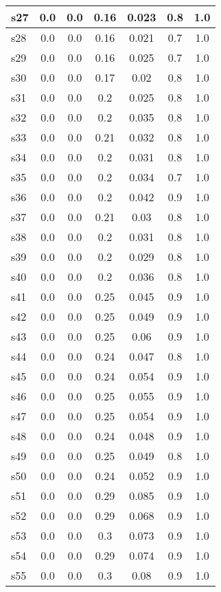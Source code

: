 \documentclass{article}
\begin{document}
\begin{tabular}{|l|c|c|c|c|c|c|}
\hline
s27 &0.0 & 0.0 & 0.16 & 0.023 & 0.8 & 1.0\\
\hline
s28 &0.0 & 0.0 & 0.16 & 0.021 & 0.7 & 1.0\\
\hline
s29 &0.0 & 0.0 & 0.16 & 0.025 & 0.7 & 1.0\\
\hline
s30 &0.0 & 0.0 & 0.17 & 0.02 & 0.8 & 1.0\\
\hline
s31 &0.0 & 0.0 & 0.2 & 0.025 & 0.8 & 1.0\\
\hline
s32 &0.0 & 0.0 & 0.2 & 0.035 & 0.8 & 1.0\\
\hline
s33 &0.0 & 0.0 & 0.21 & 0.032 & 0.8 & 1.0\\
\hline
s34 &0.0 & 0.0 & 0.2 & 0.031 & 0.8 & 1.0\\
\hline
s35 &0.0 & 0.0 & 0.2 & 0.034 & 0.7 & 1.0\\
\hline
s36 &0.0 & 0.0 & 0.2 & 0.042 & 0.9 & 1.0\\
\hline
s37 &0.0 & 0.0 & 0.21 & 0.03 & 0.8 & 1.0\\
\hline
s38 &0.0 & 0.0 & 0.2 & 0.031 & 0.8 & 1.0\\
\hline
s39 &0.0 & 0.0 & 0.2 & 0.029 & 0.8 & 1.0\\
\hline
s40 &0.0 & 0.0 & 0.2 & 0.036 & 0.8 & 1.0\\
\hline
s41 &0.0 & 0.0 & 0.25 & 0.045 & 0.9 & 1.0\\
\hline
s42 &0.0 & 0.0 & 0.25 & 0.049 & 0.9 & 1.0\\
\hline
s43 &0.0 & 0.0 & 0.25 & 0.06 & 0.9 & 1.0\\
\hline
s44 &0.0 & 0.0 & 0.24 & 0.047 & 0.8 & 1.0\\
\hline
s45 &0.0 & 0.0 & 0.24 & 0.054 & 0.9 & 1.0\\
\hline
s46 &0.0 & 0.0 & 0.25 & 0.055 & 0.9 & 1.0\\
\hline
s47 &0.0 & 0.0 & 0.25 & 0.054 & 0.9 & 1.0\\
\hline
s48 &0.0 & 0.0 & 0.24 & 0.048 & 0.9 & 1.0\\
\hline
s49 &0.0 & 0.0 & 0.25 & 0.049 & 0.8 & 1.0\\
\hline
s50 &0.0 & 0.0 & 0.24 & 0.052 & 0.9 & 1.0\\
\hline
s51 &0.0 & 0.0 & 0.29 & 0.085 & 0.9 & 1.0\\
\hline
s52 &0.0 & 0.0 & 0.29 & 0.068 & 0.9 & 1.0\\
\hline
s53 &0.0 & 0.0 & 0.3 & 0.073 & 0.9 & 1.0\\
\hline
s54 &0.0 & 0.0 & 0.29 & 0.074 & 0.9 & 1.0\\
\hline
s55 &0.0 & 0.0 & 0.3 & 0.08 & 0.9 & 1.0\\

\end{tabular}
\end{document}
